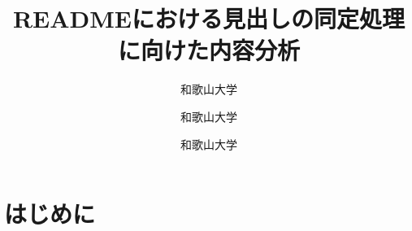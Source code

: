 \documentclass[uplatex,dvipdfmx,a4paper,twocolumn,base=11pt,jbase=11pt,ja=standard]{bxjsarticle}  %
\title{READMEにおける見出しの同定処理に向けた内容分析}{English title}
\author{和歌山大学}{石岡 直樹}{Naoki Ishioka, Wakayama University}
\author{和歌山大学}{伊原 彰紀}{Akinori Ihara, Wakayama University}
\author{和歌山大学}{南 雄太}{Yuta Minami, Wakayama University}
\begin{document}
\maketitle


\section{はじめに}



\end{document}
